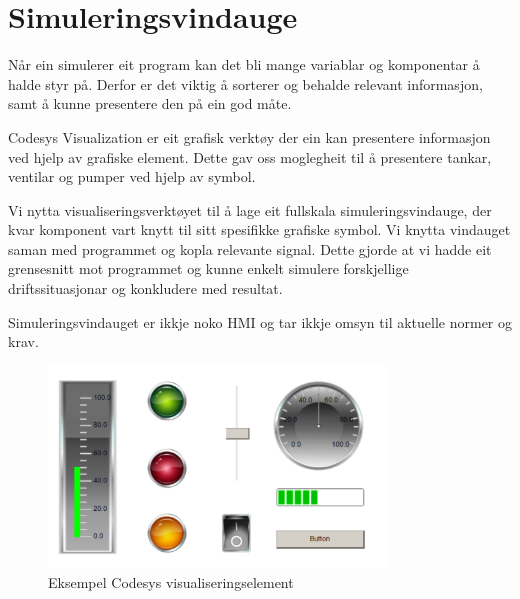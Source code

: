 \section{Simuleringsvindauge}
\thispagestyle{fancy}

Når ein simulerer eit program kan det bli mange variablar og komponentar
å halde styr på. Derfor er det viktig å sorterer og behalde relevant informasjon, 
samt å kunne presentere den på ein god måte.

\gls{Codesys} Visualization \citep{CodesysVizualisation} er eit grafisk verktøy der ein kan presentere informasjon ved hjelp av grafiske element. 
Dette gav oss moglegheit til å presentere tankar, ventilar og pumper ved hjelp av symbol. 

Vi nytta visualiseringsverktøyet til å lage eit fullskala simuleringsvindauge, der kvar komponent vart knytt til sitt spesifikke grafiske symbol.
Vi knytta vindauget saman med programmet og kopla relevante signal.
Dette gjorde at vi hadde eit grensesnitt mot programmet og kunne enkelt simulere
forskjellige driftssituasjonar og konkludere med resultat.

Simuleringsvindauget er ikkje noko \gls{HMI} og tar ikkje omsyn til aktuelle normer og krav.

\begin{figure}[htbp]
    \centering
    \includegraphics[width=0.8\textwidth]{Bilder/Codesys symbol.png}
    \caption{Eksempel \gls{Codesys} visualiseringselement}\label{fig:CodesysVisualisering}
\end{figure}

\newpage
